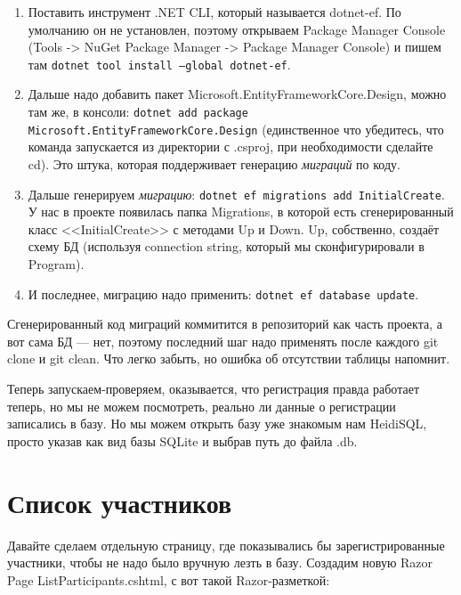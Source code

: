 \documentclass{../../text-style}
\begin{document}
\begin{enumerate}
    \item Поставить инструмент .NET CLI, который называется dotnet-ef. По умолчанию он не установлен, поэтому открываем Package Manager Console (Tools -> NuGet Package Manager -> Package Manager Console) и пишем там \texttt{dotnet tool install --global dotnet-ef}.
    \item Дальше надо добавить пакет Microsoft.EntityFrameworkCore.Design, можно там же, в консоли: \texttt{dotnet add package Microsoft.EntityFrameworkCore.Design} (единственное что убедитесь, что команда запускается из директории с .csproj, при необходимости сделайте cd). Это штука, которая поддерживает генерацию \emph{миграций} по коду.
    \item Дальше генерируем \emph{миграцию}: \texttt{dotnet ef migrations add InitialCreate}. У нас в проекте появилась папка Migrations, в которой есть сгенерированный класс <<InitialCreate>> с методами Up и Down. Up, собственно, создаёт схему БД (используя connection string, который мы сконфигурировали в Program).
    \item И последнее, миграцию надо применить: \texttt{dotnet ef database update}.
\end{enumerate}

Сгенерированный код миграций коммитится в репозиторий как часть проекта, а вот сама БД --- нет, поэтому последний шаг надо применять после каждого git clone и git clean. Что легко забыть, но ошибка об отсутствии таблицы напомнит.

Теперь запускаем-проверяем, оказывается, что регистрация правда работает теперь, но мы не можем посмотреть, реально ли данные о регистрации записались в базу. Но мы можем открыть базу уже знакомым нам HeidiSQL, просто указав как вид базы SQLite и выбрав путь до файла .db. 

\section{Список участников}

Давайте сделаем отдельную страницу, где показывались бы зарегистрированные участники, чтобы не надо было вручную лезть в базу. Создадим новую Razor Page ListParticipants.cshtml, с вот такой Razor-разметкой:
\end{document}
